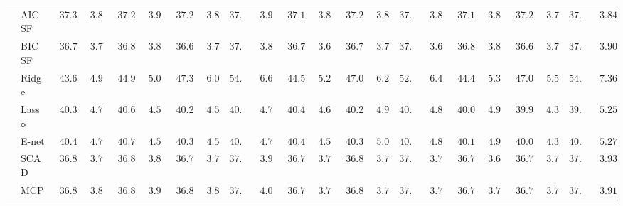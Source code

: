 \begin{tabular}{ll|ll|llllll|llllll|llllll}
 & AIC SF  & $\phantom{0}37.30$ & $\phantom{0}3.88$ & $\phantom{0}37.29$ & $\phantom{0}3.91$ & $\phantom{0}37.22$ & $\phantom{0}3.85$ & $37.32$ & $\phantom{0}3.93$ & $\phantom{0}37.18$ & $\phantom{0}3.82$ & $\phantom{0}37.21$ & $\phantom{0}3.87$ & $37.15$ & $\phantom{0}3.89$ & $\phantom{0}37.18$ & $\phantom{0}3.82$ & $\phantom{0}37.20$ & $\phantom{0}3.78$ & $37.20$ & $\phantom{0}3.84$ \\
 & BIC SF  & $\phantom{0}36.75$ & $\phantom{0}3.76$ & $\phantom{0}36.84$ & $\phantom{0}3.84$ & $\phantom{0}36.67$ & $\phantom{0}3.78$ & $37.01$ & $\phantom{0}3.80$ & $\phantom{0}36.78$ & $\phantom{0}3.68$ & $\phantom{0}36.75$ & $\phantom{0}3.75$ & $37.09$ & $\phantom{0}3.64$ & $\phantom{0}36.82$ & $\phantom{0}3.81$ & $\phantom{0}36.68$ & $\phantom{0}3.70$ & $37.01$ & $\phantom{0}3.90$ \\
 & Ridge  & $\phantom{0}43.63$ & $\phantom{0}4.99$ & $\phantom{0}44.93$ & $\phantom{0}5.03$ & $\phantom{0}47.39$ & $\phantom{0}6.01$ & $54.89$ & $\phantom{0}6.61$ & $\phantom{0}44.53$ & $\phantom{0}5.23$ & $\phantom{0}47.08$ & $\phantom{0}6.22$ & $52.84$ & $\phantom{0}6.42$ & $\phantom{0}44.47$ & $\phantom{0}5.36$ & $\phantom{0}47.08$ & $\phantom{0}5.54$ & $54.62$ & $\phantom{0}7.36$ \\
 & Lasso  & $\phantom{0}40.35$ & $\phantom{0}4.71$ & $\phantom{0}40.68$ & $\phantom{0}4.55$ & $\phantom{0}40.26$ & $\phantom{0}4.54$ & $40.28$ & $\phantom{0}4.74$ & $\phantom{0}40.40$ & $\phantom{0}4.62$ & $\phantom{0}40.22$ & $\phantom{0}4.97$ & $40.28$ & $\phantom{0}4.88$ & $\phantom{0}40.03$ & $\phantom{0}4.96$ & $\phantom{0}39.91$ & $\phantom{0}4.35$ & $39.97$ & $\phantom{0}5.25$ \\
 & E-net  & $\phantom{0}40.41$ & $\phantom{0}4.72$ & $\phantom{0}40.75$ & $\phantom{0}4.55$ & $\phantom{0}40.32$ & $\phantom{0}4.57$ & $40.26$ & $\phantom{0}4.79$ & $\phantom{0}40.42$ & $\phantom{0}4.59$ & $\phantom{0}40.31$ & $\phantom{0}5.00$ & $40.33$ & $\phantom{0}4.87$ & $\phantom{0}40.10$ & $\phantom{0}4.92$ & $\phantom{0}40.00$ & $\phantom{0}4.37$ & $40.03$ & $\phantom{0}5.27$ \\
 & SCAD  & $\phantom{0}36.86$ & $\phantom{0}3.78$ & $\phantom{0}36.86$ & $\phantom{0}3.87$ & $\phantom{0}36.78$ & $\phantom{0}3.78$ & $37.31$ & $\phantom{0}3.99$ & $\phantom{0}36.71$ & $\phantom{0}3.74$ & $\phantom{0}36.80$ & $\phantom{0}3.73$ & $37.40$ & $\phantom{0}3.75$ & $\phantom{0}36.78$ & $\phantom{0}3.69$ & $\phantom{0}36.75$ & $\phantom{0}3.75$ & $37.34$ & $\phantom{0}3.93$ \\
 & MCP  & $\phantom{0}36.88$ & $\phantom{0}3.81$ & $\phantom{0}36.89$ & $\phantom{0}3.93$ & $\phantom{0}36.81$ & $\phantom{0}3.81$ & $37.31$ & $\phantom{0}4.01$ & $\phantom{0}36.73$ & $\phantom{0}3.73$ & $\phantom{0}36.81$ & $\phantom{0}3.74$ & $37.48$ & $\phantom{0}3.77$ & $\phantom{0}36.79$ & $\phantom{0}3.74$ & $\phantom{0}36.75$ & $\phantom{0}3.74$ & $37.34$ & $\phantom{0}3.91$ \\

\end{tabular}
